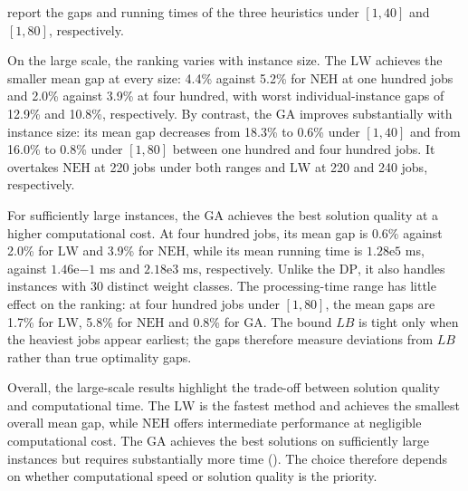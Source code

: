 ﻿\documentclass[12pt]{article} \textheight=24.5cm \textwidth=16.5cm \parskip = 0.165cm
\begin{document}
\begin{sloppypar}
         report the gaps and running times of the three heuristics under $[1,40]$ and $[1,80]$, respectively.

        On the large scale, the ranking varies with instance size.
        The $\mathrm{LW}$ achieves the smaller mean gap at every size: 4.4\% against 5.2\% for $\mathrm{NEH}$ at one hundred jobs and 2.0\% against 3.9\% at four hundred, with worst individual-instance gaps of 12.9\% and 10.8\%, respectively.
        By contrast, the $\mathrm{GA}$ improves substantially with instance size: its mean gap decreases from 18.3\% to 0.6\% under $[1,40]$ and from 16.0\% to 0.8\% under $[1,80]$ between one hundred and four hundred jobs.
        It overtakes $\mathrm{NEH}$ at 220 jobs under both ranges and $\mathrm{LW}$ at 220 and 240 jobs, respectively.

        For sufficiently large instances, the $\mathrm{GA}$ achieves the best solution quality at a higher computational cost.
        At four hundred jobs, its mean gap is 0.6\% against 2.0\% for $\mathrm{LW}$ and 3.9\% for $\mathrm{NEH}$, while its mean running time is $1.28\mathrm{e}5$ ms, against $1.46\mathrm{e}{-1}$ ms and $2.18\mathrm{e}3$ ms, respectively.
        Unlike the $\mathrm{DP}$, it also handles instances with 30 distinct weight classes.
        The processing-time range has little effect on the ranking: at four hundred jobs under $[1,80]$, the mean gaps are 1.7\% for $\mathrm{LW}$, 5.8\% for $\mathrm{NEH}$ and 0.8\% for $\mathrm{GA}$.
        The bound $LB$ is tight only when the heaviest jobs appear earliest; the gaps therefore measure deviations from $LB$ rather than true optimality gaps.

        Overall, the large-scale results highlight the trade-off between solution quality and computational time.
        The $\mathrm{LW}$ is the fastest method and achieves the smallest overall mean gap, while $\mathrm{NEH}$ offers intermediate performance at negligible computational cost.
        The $\mathrm{GA}$ achieves the best solutions on sufficiently large instances but requires substantially more time ().
        The choice therefore depends on whether computational speed or solution quality is the priority.


\end{sloppypar}
\end{document}
